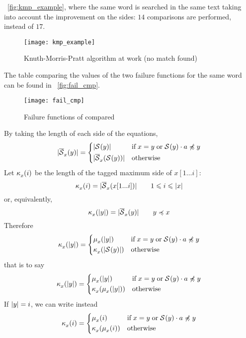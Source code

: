 \fig~\vref{fig:kmp_example}, where the same word is searched in the
same text taking into account the improvement on the sides: \(14\)
comparisons are performed, instead of \(17\).
\begin{figure}[!h]
\centering
\texttt{[image: kmp\_example]}
\caption{Knuth\hyp{}Morris\hyp{}Pratt algorithm at work
(no match found)
\label{fig:kmp_example}}
\end{figure}
The table comparing the values of the two failure functions for the
same word  can be found in
\fig~\vref{fig:fail_cmp}.
\begin{figure}[b]
\centering
\texttt{[image: fail\_cmp]}
\caption{Failure functions of 
compared \label{fig:fail_cmp}}
\end{figure}
By taking the length of each side of the equations,
\[
  \lvert{\overline{\mathcal{S}}_{x}^{}(y)}\lvert{}
= \left\lbrace
  \begin{aligned}
    &  \lvert{\mathcal{S}^{}(y)}\lvert{}
    && \text{if} \; x = y \; \text{or} 
       \; \mathcal{S}^{}(y) \cdot a \not\preccurlyeq y\\
    &  \lvert{\overline{\mathcal{S}}_{x}^{}(\mathcal{S}^{}(y))}\lvert{}
    && \text{otherwise}
  \end{aligned}
  \right.
\]
Let \(\kappa_{x}^{}(i)\) be the length of the tagged maximum
side of \(x[1 \dots i]\):
\[
\kappa_{x}^{}(i) = \lvert{\overline{\mathcal{S}}_{x}^{}(x[1...i])}\lvert{} 
\qquad 1 \leqslant i \leqslant \lvert{x}\lvert{}
\]
or, equivalently,
\[
\kappa_{x}^{}(\lvert{y}\lvert{}) = \lvert{\overline{\mathcal{S}}_{x}^{}(y)}\lvert{} 
\qquad y \preccurlyeq x
\]
Therefore
\[
  \kappa_{x}^{}(\lvert{y}\lvert{})
= \left\lbrace
  \begin{aligned}
    &  \mu_{x}^{}(\lvert{y}\lvert{})
    && \text{if} \; x = y \; \text{or} 
       \; \mathcal{S}^{}(y) \cdot a \not\preccurlyeq y\\
    &  \kappa_{x}^{}(\lvert{\mathcal{S}^{}(y)}\lvert{})
    && \text{otherwise}
  \end{aligned}
  \right.
\]
that is to say
\[
  \kappa_{x}^{}(\lvert{y}\lvert{})
= \left\lbrace
  \begin{aligned}
    &  \mu_{x}^{}(\lvert{y}\lvert{})
    && \text{if} \; x = y \; \text{or} 
       \; \mathcal{S}^{}(y) \cdot a \not\preccurlyeq y\\
    &  \kappa_{x}^{}(\mu_{x}^{}(\lvert{y}\lvert{}))
    && \text{otherwise}
  \end{aligned}
  \right.
\]
If \(\lvert{y}\lvert{} = i\), we can write instead
\[
  \kappa_{x}^{}(i)
= \left\lbrace
  \begin{aligned}
    &  \mu_{x}^{}(i)
    && \text{if} \; x = y \; \text{or} 
       \; \mathcal{S}^{}(y) \cdot a \not\preccurlyeq y\\
    &  \kappa_{x}^{}(\mu_{x}^{}(i))
    && \text{otherwise}
  \end{aligned}
  \right.
\]
